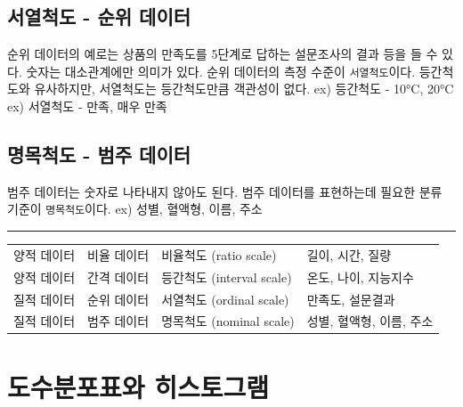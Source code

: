 \documentclass[
  letterpaper,
  DIV=11,
  numbers=noendperiod]{scrreprt}
\begin{document}
\hypertarget{uxc11cuxc5f4uxcc99uxb3c4---uxc21cuxc704-uxb370uxc774uxd130}{%
\section{서열척도 - 순위
데이터}\label{uxc11cuxc5f4uxcc99uxb3c4---uxc21cuxc704-uxb370uxc774uxd130}}

순위 데이터의 예로는 상품의 만족도를 5단계로 답하는 설문조사의 결과 등을
들 수 있다. 숫자는 대소관계에만 의미가 있다. 순위 데이터의 측정 수준이
\texttt{서열척도}이다. 등간척도와 유사하지만, 서열척도는 등간척도만큼
객관성이 없다. ex) 등간척도 - 10°C, 20°C ex) 서열척도 - 만족, 매우 만족

\hypertarget{uxba85uxbaa9uxcc99uxb3c4---uxbc94uxc8fc-uxb370uxc774uxd130}{%
\section{명목척도 - 범주
데이터}\label{uxba85uxbaa9uxcc99uxb3c4---uxbc94uxc8fc-uxb370uxc774uxd130}}

범주 데이터는 숫자로 나타내지 않아도 된다. 범주 데이터를 표현하는데
필요한 분류 기준이 \texttt{명목척도}이다. ex) 성별, 혈액형, 이름, 주소

\begin{center}\rule{0.5\linewidth}{0.5pt}\end{center}

\begin{longtable}[]{@{}
  >{\raggedright\arraybackslash}p{}
  >{\raggedright\arraybackslash}p{}
  >{\raggedright\arraybackslash}p{}
  >{\raggedright\arraybackslash}p{}@{}}
\toprule\noalign{}
\endhead
\bottomrule\noalign{}
\endlastfoot
양적 데이터 & 비율 데이터 & 비율척도 (ratio scale) & 길이, 시간, 질량 \\
양적 데이터 & 간격 데이터 & 등간척도 (interval scale) & 온도, 나이,
지능지수 \\
질적 데이터 & 순위 데이터 & 서열척도 (ordinal scale) & 만족도,
설문결과 \\
질적 데이터 & 범주 데이터 & 명목척도 (nominal scale) & 성별, 혈액형,
이름, 주소 \\
\end{longtable}

\hypertarget{uxb3c4uxc218uxbd84uxd3ecuxd45cuxc640-uxd788uxc2a4uxd1a0uxadf8uxb7a8}{%
\chapter{도수분포표와
히스토그램}\label{uxb3c4uxc218uxbd84uxd3ecuxd45cuxc640-uxd788uxc2a4uxd1a0uxadf8uxb7a8}}
\end{document}

